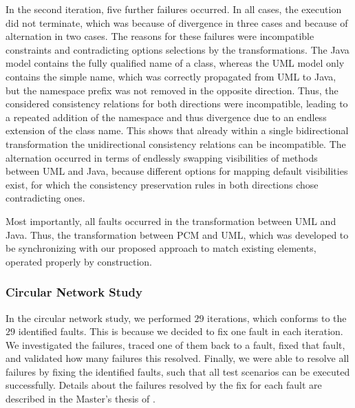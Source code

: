 In the second iteration, five further failures occurred.
In all cases, the execution did not terminate, which was because of divergence in three cases and because of alternation in two cases.
The reasons for these failures were incompatible constraints and contradicting options selections by the transformations.
The Java model contains the fully qualified name of a class, whereas the \gls{UML} model only contains the simple name, which was correctly propagated from \gls{UML} to Java, but the namespace prefix was not removed in the opposite direction.
Thus, the considered consistency relations for both directions were incompatible, leading to a repeated addition of the namespace and thus divergence due to an endless extension of the class name.
This shows that already within a single bidirectional transformation the unidirectional consistency relations can be incompatible.
The alternation occurred in terms of endlessly swapping visibilities of methods between \gls{UML} and Java, because different options for mapping default visibilities exist, for which the consistency preservation rules in both directions chose contradicting ones.

Most importantly, all faults occurred in the transformation between \gls{UML} and Java.
Thus, the transformation between \gls{PCM} and \gls{UML}, which was developed to be synchronizing with our proposed approach to match existing elements, operated properly by construction.

\subsubsection*{Circular Network Study} 

In the circular network study, we performed $29$ iterations, which conforms to the $29$ identified faults.
This is because we decided to fix one fault in each iteration.
We investigated the failures, traced one of them back to a fault, fixed that fault, and validated how many failures this resolved.
Finally, we were able to resolve all failures by fixing the identified faults, such that all test scenarios can be executed successfully.
Details about the failures resolved by the fix for each fault are described in the Master's thesis of .

